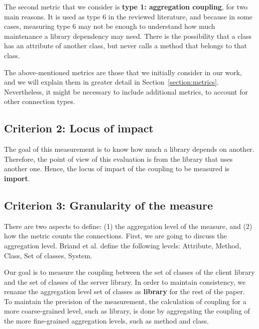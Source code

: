 \documentclass[a4paper]{article}
\begin{document}
The second metric that we consider is \textbf{type 1: aggregation coupling}, for two main reasons. It is used as type 6 in the reviewed literature, and because in some cases, measuring type 6 may not be enough to understand how much maintenance a library dependency may need. There is the possibility that a class has an attribute of another class, but never calls a method that belongs to that class.

The above-mentioned metrics are those that we initially consider in our work, and we will explain them in greater detail in Section~\ref{section:metrics}. Nevertheless, it might be necessary to include additional metrics, %
to account for other connection types.

\subsection{Criterion 2: Locus of impact}
The goal of this measurement is to know how much a library depends on another. Therefore, the point of view of this evaluation is from the library that uses another one. Hence, the locus of impact of the coupling to be measured %
is \textbf{import}.

\subsection{Criterion 3: Granularity of the measure}
There are two aspects to define: (1) the aggregation level of the measure, and (2) how the metric counts the connections.
First, we are going to discuss the aggregation level. Briand et al. define the following levels: Attribute, Method, Class, Set of classes, System.

Our goal is to measure the coupling between the set of classes of the client library and the set of classes of the server library. %
In order to maintain consistency, we rename the aggregation level set of classes as \textbf{library} for the rest of the paper. To maintain the precision of the measurement, the calculation of coupling for a more coarse-grained level, such as library, is done by aggregating the coupling of the more fine-grained aggregation levels, such as method and class.
\end{document}

